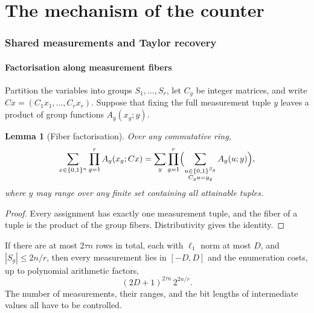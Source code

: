 \documentclass[11pt,reqno]{amsart}
\numberwithin{equation}{section}
\theoremstyle{plain}
\newtheorem{lemma}[theorem]{Lemma}
\theoremstyle{definition}
\theoremstyle{remark}
\begin{document}

\part{The mechanism of the counter}\label{part:mechanism}

\section{Shared measurements and Taylor recovery}\label{sec:measurements}

\subsection{Factorisation along measurement fibers}
Partition the variables into groups $S_1,\dots,S_r$, let $C_g$ be integer
matrices, and write $Cx=(C_1x_1,\dots,C_rx_r)$. Suppose that fixing the full
measurement tuple $y$ leaves a product of group functions $A_g(x_g;y)$.

\begin{lemma}[Fiber factorisation]\label{lem:fibers}
Over any commutative ring,
\begin{equation}\label{eq:fiber}
 \sum_{x\in\{0,1\}^n}\prod_{g=1}^rA_g(x_g;Cx)
 =\sum_y\prod_{g=1}^r\Bigl(\sum_{\substack{u\in\{0,1\}^{S_g}\\C_gu=y_g}}
 A_g(u;y)\Bigr),
\end{equation}
where $y$ may range over any finite set containing all attainable tuples.
\end{lemma}
\begin{proof}
Every assignment has exactly one measurement tuple, and the fiber of a tuple
is the product of the group fibers. Distributivity gives the identity.
\end{proof}
If there are at most $2\tau n$ rows in total, each with $\ell_1$ norm at most
$D$, and $|S_g|\le2n/r$, then every measurement lies in $[-D,D]$ and the
enumeration costs, up to polynomial arithmetic factors,
\begin{equation}\label{eq:fiber-cost}
 (2D+1)^{2\tau n}\,2^{2n/r}.
\end{equation}
The number of measurements, their ranges, and the bit lengths of
intermediate values all have to be controlled.
\end{document}
